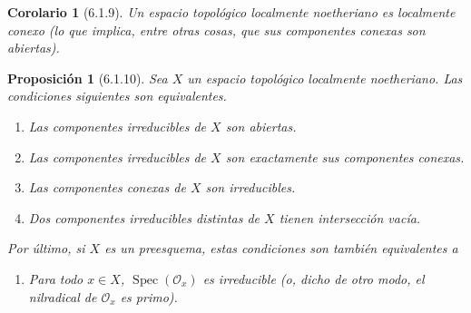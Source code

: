 \documentclass[oneside]{amsart}
\theoremstyle{ega-env-style}
\theoremstyle{ega-thm-env-style}
\newtheorem*{proposition}{Proposición}
\newtheorem*{corollary}{Corolario}
\theoremstyle{ega-defn-env-style}
\let\EGAOriginalLabel\label
\renewcommand{\label}[1]{\phantomsection\EGAOriginalLabel{#1}}
\begin{document}
\begin{corollary}[6.1.9]
\label{I.6.1.9}
Un espacio topológico localmente noetheriano es localmente conexo (lo que implica, entre otras cosas, que sus componentes conexas son abiertas).
\end{corollary}

\begin{proposition}[6.1.10]
\label{I.6.1.10}
Sea $X$ un espacio topológico localmente noetheriano.
Las condiciones siguientes son equivalentes.
\begin{enumerate}
  \item[\textup{a)}] Las componentes irreducibles de $X$ son abiertas.
  \item[\textup{b)}] Las componentes irreducibles de $X$ son exactamente sus componentes conexas.
  \item[\textup{c)}] Las componentes conexas de $X$ son irreducibles.
  \item[\textup{d)}] Dos componentes irreducibles distintas de $X$ tienen intersección vacía.
\end{enumerate}
Por último, si $X$ es un preesquema, estas condiciones son también equivalentes a
\begin{enumerate}
  \item[\textup{e)}] Para todo $x\in X$, $\operatorname{Spec}(\mathscr{O}_x)$ es irreducible (o, dicho de otro modo, el nilradical de $\mathscr{O}_x$ es primo).
\end{enumerate}
\end{proposition}
\end{document}
